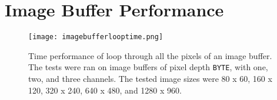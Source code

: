 \chapter{Image Buffer Performance}

\begin{figure}[htbp]
\begin{center}
\texttt{[image: imagebufferlooptime.png]}
\caption[Time performance of loop through all the pixels of an image buffer]{Time performance of loop through 
all the pixels of an image buffer. The tests were ran on image buffers of pixel depth \texttt{BYTE}, with 
one, two, and three channels. The tested image sizes were 80 x 60, 160 x 120, 320 x 240, 640 x 480, and 
1280 x 960.}
\end{center}
\end{figure}